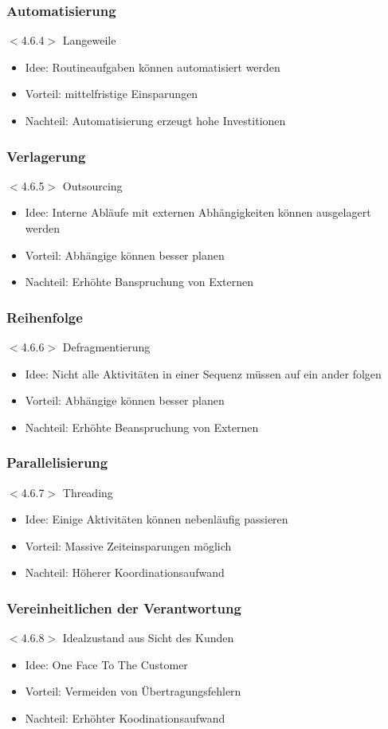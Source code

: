 \documentclass{beamer}
\begin{document}
 \begin{frame}
  \frametitle{Automatisierung}
  $<$4.6.4$>$
  Langeweile
  \begin{itemize}
    \item Idee: Routineaufgaben können automatisiert werden
    \item Vorteil: mittelfristige Einsparungen
    \item Nachteil: Automatisierung erzeugt hohe Investitionen
  \end{itemize}
 \end{frame}

 \begin{frame}
  \frametitle{Verlagerung}
  $<$4.6.5$>$
  Outsourcing
  \begin{itemize}
    \item Idee: Interne Abläufe mit externen Abhängigkeiten können ausgelagert werden
    \item Vorteil: Abhängige können besser planen
    \item Nachteil: Erhöhte Banspruchung von Externen
  \end{itemize}
 \end{frame}

 \begin{frame}
  \frametitle{Reihenfolge}
  $<$4.6.6$>$
  Defragmentierung
  \begin{itemize}
    \item Idee: Nicht alle Aktivitäten in einer Sequenz müssen auf ein ander folgen
    \item Vorteil: Abhängige können besser planen
    \item Nachteil: Erhöhte Beanspruchung von Externen
  \end{itemize}
 \end{frame}

 \begin{frame}
  \frametitle{Parallelisierung}
  $<$4.6.7$>$
  Threading
  \begin{itemize}
    \item Idee: Einige Aktivitäten können nebenläufig passieren
    \item Vorteil: Massive Zeiteinsparungen möglich
    \item Nachteil: Höherer Koordinationsaufwand
  \end{itemize}
 \end{frame}

 \begin{frame}
  \frametitle{Vereinheitlichen der Verantwortung}
  $<$4.6.8$>$
  Idealzustand aus Sicht des Kunden
  \begin{itemize}
    \item Idee: \glqq One Face To The Customer\grqq
    \item Vorteil: Vermeiden von Übertragungsfehlern
    \item Nachteil: Erhöhter Koodinationsaufwand
  \end{itemize}
 \end{frame}
\end{document}
